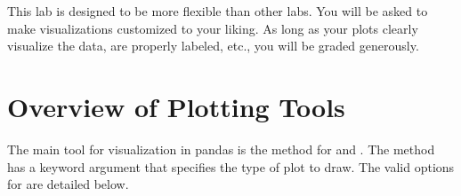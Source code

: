 
\begin{info}
    This lab is designed to be more flexible than other labs.
    You will be asked to make visualizations customized to your liking.
    As long as your plots clearly visualize the data, are properly labeled, etc., you will be graded generously.
\end{info}





\section*{Overview of Plotting Tools} %

The main tool for visualization in pandas is the  method for  and .
The method has a keyword argument  that specifies the type of plot to draw.
The valid options for  are detailed below.

